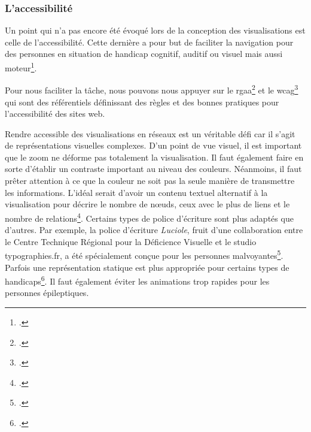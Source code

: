 \subsubsection{L'accessibilité}

Un point qui n'a pas encore été évoqué lors de la conception des visualisations est celle de l'accessibilité. Cette dernière a pour but de faciliter la navigation pour des personnes en situation de handicap cognitif, auditif ou visuel mais aussi moteur\footcite{QuestCeQue2025}.

Pour nous faciliter la tâche, nous pouvons nous appuyer sur le \gls{rgaa}\footcite{directioninterministerielledunumeriquedinumReferentielGeneralDamelioration2023} et le \gls{wcag}\footcite{w3cwebaccessibilityinitiativewaiReglesPourLaccessibilite} qui sont des référentiels définissant des règles et des bonnes pratiques pour l'accessibilité des sites web.

Rendre accessible des visualisations en réseaux est un véritable défi car il s'agit de représentations visuelles complexes. D'un point de vue visuel, il est important que le zoom ne déforme pas totalement la visualisation. Il faut également faire en sorte d'établir un contraste important au niveau des couleurs. Néanmoins, il faut prêter attention à ce que la couleur ne soit pas la seule manière de transmettre les informations. L'idéal serait d'avoir un contenu textuel alternatif à la visualisation pour décrire le nombre de nœuds, ceux avec le plus de liens et le nombre de relations\footcite{langeUltimateChecklistAccessible2024}. Certains types de police d'écriture sont plus adaptés que d'autres. Par exemple, la police d'écriture \textit{Luciole}, fruit d'une collaboration entre le Centre Technique Régional pour la Déficience Visuelle et le studio typographies.fr, a été spécialement conçue pour les personnes malvoyantes\footcite{centretechniqueregionalpourladeficiencevisuellectrdvtypographies.frLuciole2025}. Parfois une représentation statique est plus appropriée pour certains types de handicaps\footcite{langeUltimateChecklistAccessible2024}. Il faut également éviter les animations trop rapides pour les personnes épileptiques.

